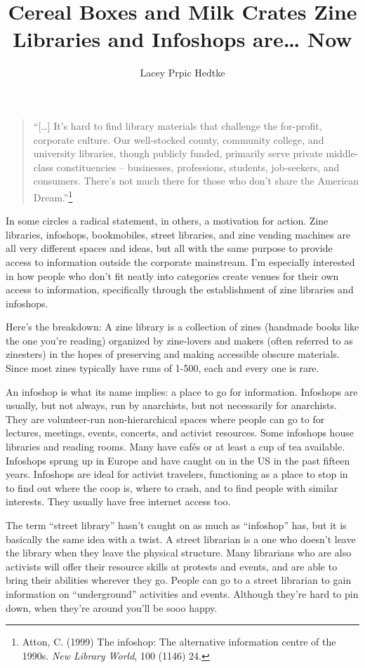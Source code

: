 \documentclass[output=paper]{langscibook}
\title{Cereal Boxes and Milk Crates Zine Libraries and Infoshops are… Now
}
\author{Lacey Prpic Hedtke}
\begin{document}
\maketitle

\begin{quote}
\enquote{{[}\ldots{]} It's hard to find library materials that challenge
the for-profit, corporate culture. Our well-stocked county, community
college, and university libraries, though publicly funded, primarily
serve private middle-class constituencies -- businesses, professions,
students, job-seekers, and consumers. There's not much there for those
who don't share the American Dream.}\footnote{Atton, C. (1999) The
  infoshop: The alternative information centre of the 1990s. \emph{New
  Library World}, 100 (1146) 24.}
\end{quote}

In some circles a radical statement, in others, a motivation for action.
Zine libraries, infoshops, bookmobiles, street libraries, and zine
vending machines are all very different spaces and ideas, but all with
the same purpose to provide access to information outside the corporate
mainstream. I'm especially interested in how people who don't fit neatly
into categories create venues for their own access to information,
specifically through the establishment of zine libraries and infoshops.

Here's the breakdown: A zine library is a collection of zines (handmade
books like the one you're reading) organized by zine-lovers and makers
(often referred to as zinesters) in the hopes of preserving and making
accessible obscure materials. Since most zines typically have runs of
1-500, each and every one is rare.

An infoshop is what its name implies: a place to go for information.
Infoshops are usually, but not always, run by anarchists, but not
necessarily for anarchists. They are volunteer-run non-hierarchical
spaces where people can go to for lectures, meetings, events, concerts,
and activist resources. Some infoshops house libraries and reading
rooms. Many have cafés or at least a cup of tea available. Infoshops
sprung up in Europe and have caught on in the US in the past fifteen
years. Infoshops are ideal for activist travelers, functioning as a
place to stop in to find out where the coop is, where to crash, and to
find people with similar interests. They usually have free internet
access too.

The term \enquote{street library} hasn't caught on as much as
\enquote{infoshop} has, but it is basically the same idea with a twist.
A street librarian is a one who doesn't leave the library when they
leave the physical structure. Many librarians who are also activists
will offer their resource skills at protests and events, and are able to
bring their abilities wherever they go. People can go to a street
librarian to gain information on \enquote{underground} activities and
events. Although they're hard to pin down, when they're around you'll be
sooo happy.
\end{document}
